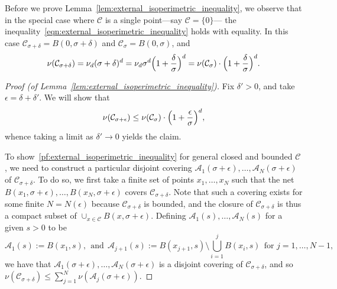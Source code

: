 \documentclass{article}
\newcommand{\1}{\mathbf{1}}
\newcommand{\mc}[1]{\mathcal{#1}}
\theoremstyle{definition}
\theoremstyle{remark}
\begin{document}
Before we prove Lemma~\ref{lem:external_isoperimetric_inequality}, we observe that in the special case where $\mc{C}$ is a single point---say $\mc{C} = \{0\}$--- the inequality~\eqref{eqn:external_isoperimetric_inequality} holds with equality. In this case $\mc{C}_{\sigma + \delta} = B(0,\sigma + \delta)$ and $\mc{C}_{\sigma} = B(0,\sigma)$, and
\begin{equation}
\label{eqn:external_isoperimetric_inequality_1}
\nu(\mc{C}_{\sigma + \delta}) = \nu_d (\sigma + \delta)^d = \nu_d \sigma^d \Bigl(1 + \frac{\delta}{\sigma}\Bigr)^d = \nu(\mc{C}_{\sigma}) \cdot \Bigl(1 + \frac{\delta}{\sigma}\Bigr)^d.
\end{equation}
\begin{proof}[Proof (of Lemma~\ref{lem:external_isoperimetric_inequality})] 
	Fix $\delta' > 0$, and take $\epsilon = \delta + \delta'$. We will show that
	\begin{equation*}
	\label{pf:external_isoperimetric_inequality}
	\nu(\mc{C}_{\sigma + \epsilon}) \leq \nu(\mc{C}_{\sigma}) \cdot \Bigl(1 + \frac{\epsilon}{\sigma}\Bigr)^d,
	\end{equation*}
	whence taking a limit as $\delta' \to 0$ yields the claim.
	
	To show~\eqref{pf:external_isoperimetric_inequality} for general closed and bounded $\mc{C}$, we need to construct a particular disjoint covering $\mc{A}_1(\sigma + \epsilon), \ldots, \mc{A}_N(\sigma + \epsilon)$ of $\mc{C}_{\sigma + \delta}$. To do so, we first take a finite set of points $x_1,\ldots,x_N$ such that the net $B(x_1,\sigma + \epsilon),\ldots,B(x_N,\sigma + \epsilon)$ covers $\mc{C}_{\sigma + \delta}$.  Note that such a covering exists for some finite $N = N(\epsilon)$ because $\mc{C}_{\sigma + \delta}$ is bounded, and the closure of $\mc{C}_{\sigma + \delta}$ is thus a compact subset of $\cup_{x \in \mc{C}} B(x,\sigma + \epsilon)$. Defining $\mc{A}_1(s), \ldots, \mc{A}_N(s)$ for a given $s > 0$ to be
	\begin{equation*}
	\mc{A}_1(s) := B(x_1,s),~~\textrm{and}~~ \mc{A}_{j + 1}(s) := B(x_{j + 1},s) \setminus \bigcup_{i = 1}^{j} B(x_i,s) ~~\textrm{for $j = 1,\ldots,N - 1$},
	\end{equation*}
	we have that $\mc{A}_1(\sigma + \epsilon),\ldots,\mc{A}_N(\sigma + \epsilon)$ is a disjoint covering of $\mc{C}_{\sigma + \delta}$, and so $\nu(\mc{C}_{\sigma + \delta}) \leq \sum_{j = 1}^{N} \nu(\mc{A}_j(\sigma + \epsilon))$. 
	

\end{proof}
\end{document}
